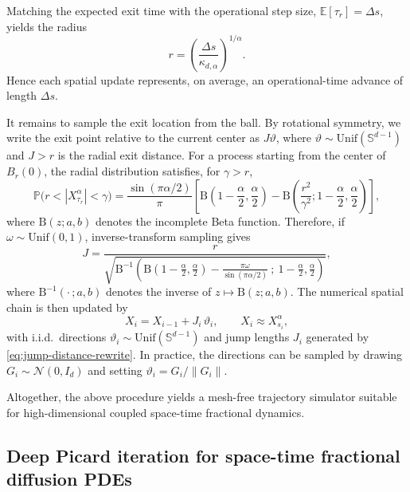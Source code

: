 \documentclass[a4paper,fleqn]{cas-sc}
\begin{document}
Matching the expected exit time with the operational step size,
$\mathbb{E}[\tau_r]=\Delta s$, yields the radius
\begin{equation}\label{eq:radius-ball}
r
=
\left(
\frac{\Delta s}{\kappa_{d,\alpha}}
\right)^{1/\alpha}.
\end{equation}
Hence each spatial update represents, on average, an operational-time advance
of length $\Delta s$.

It remains to sample the exit location from the ball. By rotational symmetry,
we write the exit point relative to the current center as $J\vartheta$, where
$\vartheta\sim\mathrm{Unif}(\mathbb{S}^{d-1})$ and $J>r$ is the radial exit
distance. For a process starting from the center of $B_r(0)$, the radial
distribution satisfies, for $\gamma>r$,
\begin{equation}\label{eq:jump-cdf-rewrite}
\mathbb{P}\bigl(r<|X^\alpha_{\tau_r}|<\gamma\bigr)
=
\frac{\sin(\pi\alpha/2)}{\pi}
\left[
\mathrm{B}\!\left(1-\frac{\alpha}{2},\frac{\alpha}{2}\right)
-
\mathrm{B}\!\left(
\frac{r^2}{\gamma^2};
1-\frac{\alpha}{2},\frac{\alpha}{2}
\right)
\right],
\end{equation}
where $\mathrm{B}(z;a,b)$ denotes the incomplete Beta function. Therefore, if
$\omega\sim\mathrm{Unif}(0,1)$, inverse-transform sampling gives
\begin{equation}\label{eq:jump-distance-rewrite}
J
=
\frac{r}{
\sqrt{
\mathrm{B}^{-1}\!\left(
\mathrm{B}\!\left(1-\frac{\alpha}{2},\frac{\alpha}{2}\right)
-\frac{\pi\omega}{\sin(\pi\alpha/2)}
\ ;\
1-\frac{\alpha}{2},\frac{\alpha}{2}
\right)
}},
\end{equation}
where $\mathrm{B}^{-1}(\cdot\,;a,b)$ denotes the inverse of
$z\mapsto \mathrm{B}(z;a,b)$. The numerical spatial chain is then updated by
\begin{equation}\label{eq:wos-update}
X_i=X_{i-1}+J_i\,\vartheta_i,
\qquad X_i\approx X^\alpha_{s_i},
\end{equation}
with i.i.d.\ directions $\vartheta_i\sim\mathrm{Unif}(\mathbb{S}^{d-1})$ and
jump lengths $J_i$ generated by \eqref{eq:jump-distance-rewrite}. In practice,
the directions can be sampled by drawing $G_i\sim\mathcal{N}(0,I_d)$ and
setting $\vartheta_i=G_i/\|G_i\|$.

Altogether, the above procedure yields a mesh-free trajectory simulator suitable
for high-dimensional coupled space-time fractional dynamics.

\subsection{Deep Picard iteration for space-time fractional diffusion PDEs}
\label{subsec:method:dpi}
\end{document}
